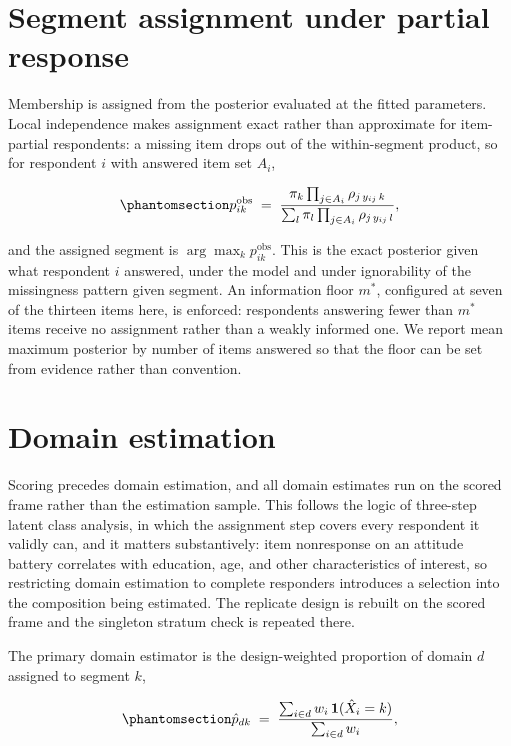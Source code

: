 \documentclass[
  12pt]{article}
\begin{document}
\section{Segment assignment under partial
response}\label{sec-assignment}

Membership is assigned from the posterior evaluated at the fitted
parameters. Local independence makes assignment exact rather than
approximate for item-partial respondents: a missing item drops out of
the within-segment product, so for respondent \(i\) with answered item
set \(A_i\),

\begin{equation}\phantomsection\label{eq-partial}{
p_{ik}^{\mathrm{obs}} \;=\;
\frac{\pi_k \prod_{j \in A_i} \rho_{j\,y_{ij}\,k}}
{\sum_l \pi_l \prod_{j \in A_i} \rho_{j\,y_{ij}\,l}},
}\end{equation}

and the assigned segment is \(\arg\max_k p_{ik}^{\mathrm{obs}}\). This
is the exact posterior given what respondent \(i\) answered, under the
model and under ignorability of the missingness pattern given segment.
An information floor \(m^{*}\), configured at seven of the thirteen
items here, is enforced: respondents answering fewer than \(m^{*}\)
items receive no assignment rather than a weakly informed one. We report
mean maximum posterior by number of items answered so that the floor can
be set from evidence rather than convention.

\section{Domain estimation}\label{sec-domains}

Scoring precedes domain estimation, and all domain estimates run on the
scored frame rather than the estimation sample. This follows the logic
of three-step latent class analysis, in which the assignment step covers
every respondent it validly can, and it matters substantively: item
nonresponse on an attitude battery correlates with education, age, and
other characteristics of interest, so restricting domain estimation to
complete responders introduces a selection into the composition being
estimated. The replicate design is rebuilt on the scored frame and the
singleton stratum check is repeated there.

The primary domain estimator is the design-weighted proportion of domain
\(d\) assigned to segment \(k\),

\begin{equation}\phantomsection\label{eq-domdesign}{
\hat p_{dk} \;=\; \frac{\sum_{i \in d} w_i \, \mathbf{1}(\hat X_i = k)}
{\sum_{i \in d} w_i},
}\end{equation}
\end{document}
